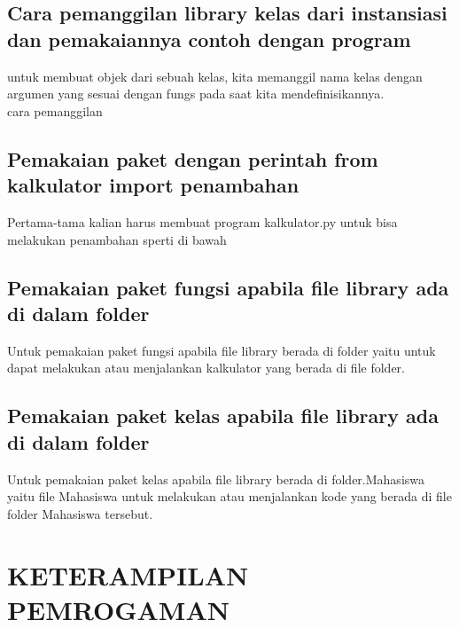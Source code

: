 \subsection{Cara pemanggilan library kelas dari instansiasi dan pemakaiannya contoh dengan program}
untuk membuat objek dari sebuah kelas, kita memanggil nama kelas dengan argumen yang sesuai dengan   fungs pada saat kita mendefinisikannya.
\\cara pemanggilan\\

\subsection{Pemakaian paket dengan perintah from kalkulator import penambahan}
Pertama-tama kalian harus membuat program kalkulator.py untuk bisa melakukan penambahan sperti di bawah

\subsection{Pemakaian paket fungsi apabila file library ada di dalam folder}
Untuk pemakaian paket fungsi apabila file library berada di folder yaitu untuk dapat melakukan atau menjalankan kalkulator yang berada di file folder.

\subsection{Pemakaian paket kelas apabila file library ada di dalam folder}
Untuk pemakaian paket kelas apabila file library berada di folder.Mahasiswa yaitu file Mahasiswa untuk melakukan atau menjalankan kode yang berada di file folder Mahasiswa tersebut.

\section{KETERAMPILAN PEMROGAMAN}

















